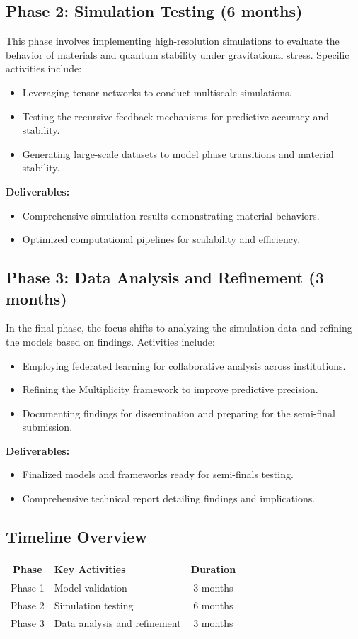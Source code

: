 \documentclass{article}
\theoremstyle{plain}
\begin{document}
\subsection{Phase 2: Simulation Testing (6 months)}
This phase involves implementing high-resolution simulations to evaluate the behavior of materials and quantum stability under gravitational stress. Specific activities include:
\begin{itemize}
    \item Leveraging tensor networks to conduct multiscale simulations.
    \item Testing the recursive feedback mechanisms for predictive accuracy and stability.
    \item Generating large-scale datasets to model phase transitions and material stability.
\end{itemize}
\textbf{Deliverables:}
\begin{itemize}
    \item Comprehensive simulation results demonstrating material behaviors.
    \item Optimized computational pipelines for scalability and efficiency.
\end{itemize}

\subsection{Phase 3: Data Analysis and Refinement (3 months)}
In the final phase, the focus shifts to analyzing the simulation data and refining the models based on findings. Activities include:
\begin{itemize}
    \item Employing federated learning for collaborative analysis across institutions.
    \item Refining the Multiplicity framework to improve predictive precision.
    \item Documenting findings for dissemination and preparing for the semi-final submission.
\end{itemize}
\textbf{Deliverables:}
\begin{itemize}
    \item Finalized models and frameworks ready for semi-finals testing.
    \item Comprehensive technical report detailing findings and implications.
\end{itemize}

\subsection{Timeline Overview}
\begin{center}
\begin{tabular}{|c|l|c|}
\hline
\textbf{Phase} & \textbf{Key Activities} & \textbf{Duration} \\
\hline
Phase 1 & Model validation & 3 months \\
\hline
Phase 2 & Simulation testing & 6 months \\
\hline
Phase 3 & Data analysis and refinement & 3 months \\
\hline
\end{tabular}
\end{center}
\end{document}
